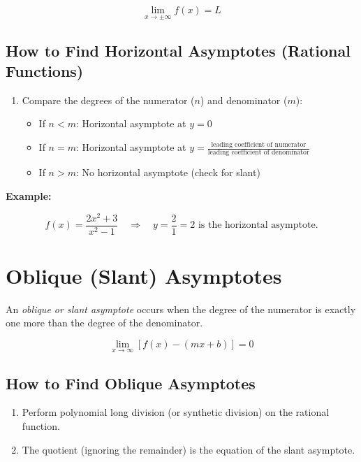 \[
    \lim_{x \to \pm\infty} f(x) = L
\]

\subsection{How to Find Horizontal Asymptotes (Rational Functions)}

\begin{enumerate}

    \item Compare the degrees of the numerator (\(n\)) and denominator (\(m\)):

    \begin{itemize}

        \item If \(n < m\): Horizontal asymptote at \(y = 0\)

        \item If \(n = m\): Horizontal asymptote at \(y = \frac{\text{leading coefficient of numerator}}
        {\text{leading coefficient of denominator}}\)

        \item If \(n > m\): No horizontal asymptote (check for slant)

    \end{itemize}

\end{enumerate}

\textbf{Example:}

\[
    f(x) = \frac{2x^2 + 3}{x^2 - 1} \quad \Rightarrow \quad y = \frac{2}{1} = 2 
    \text{ is the horizontal asymptote.}
\]

\section{Oblique (Slant) Asymptotes}

An \emph{oblique or slant asymptote} occurs when the degree of the numerator is exactly one more than 
the degree of the denominator.

\[
    \lim_{x \to \infty} [f(x) - (mx + b)] = 0
\]

\subsection{How to Find Oblique Asymptotes}

\begin{enumerate}
    
    \item Perform polynomial long division (or synthetic division) on the rational function.
    
    \item The quotient (ignoring the remainder) is the equation of the slant asymptote.

\end{enumerate}

